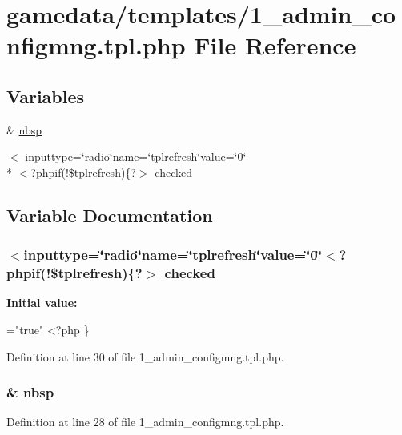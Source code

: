 \hypertarget{1__admin__configmng_8tpl_8php}{\section{gamedata/templates/1\+\_\+admin\+\_\+configmng.tpl.\+php File Reference}
\label{1__admin__configmng_8tpl_8php}
}
\subsection*{Variables}
\begin{DoxyCompactItemize}
\item 
\& \hyperlink{1__admin__configmng_8tpl_8php_aef915316f784c9063d942974538301a6}{nbsp}
\item 
$<$ inputtype=\char`\"{}radio\char`\"{}name=\char`\"{}tplrefresh\char`\"{}value=\char`\"{}0\char`\"{}\\*
$<$?phpif(!\$tplrefresh)\{?$>$ \hyperlink{1__admin__configmng_8tpl_8php_a0f21011c9c0c7e602239b225af8c05e8}{checked}
\end{DoxyCompactItemize}


\subsection{Variable Documentation}
\hypertarget{1__admin__configmng_8tpl_8php_a0f21011c9c0c7e602239b225af8c05e8}{
\subsubsection[{checked}]{\setlength{\rightskip}{0pt plus 5cm}$<$inputtype=\char`\"{}radio\char`\"{}name=\char`\"{}tplrefresh\char`\"{}value=\char`\"{}0\char`\"{}$<$?phpif(!\$tplrefresh)\{?$>$ checked}}\label{1__admin__configmng_8tpl_8php_a0f21011c9c0c7e602239b225af8c05e8}
{\bfseries Initial value\+:}
\begin{DoxyCode}
=\textcolor{stringliteral}{"true"}
<?php \}
\end{DoxyCode}


Definition at line 30 of file 1\+\_\+admin\+\_\+configmng.\+tpl.\+php.

\hypertarget{1__admin__configmng_8tpl_8php_aef915316f784c9063d942974538301a6}{
\subsubsection[{nbsp}]{\setlength{\rightskip}{0pt plus 5cm}\& nbsp}}\label{1__admin__configmng_8tpl_8php_aef915316f784c9063d942974538301a6}


Definition at line 28 of file 1\+\_\+admin\+\_\+configmng.\+tpl.\+php.

